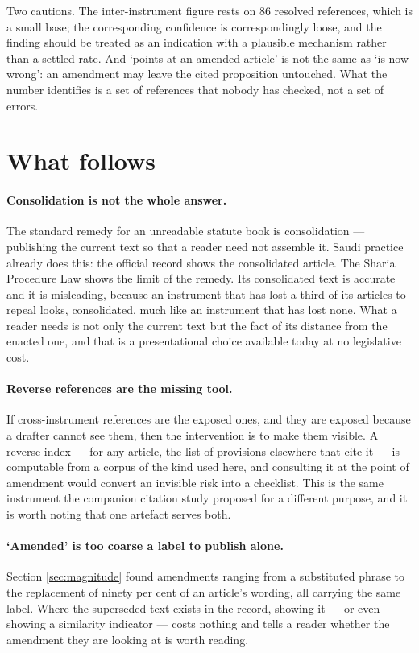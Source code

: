 \documentclass[11pt]{article}
\begin{document}
Two cautions. The inter-instrument figure rests on 86 resolved references,
which is a small base; the corresponding confidence is correspondingly loose,
and the finding should be treated as an indication with a plausible mechanism
rather than a settled rate. And `points at an amended article' is not the same
as `is now wrong': an amendment may leave the cited proposition untouched.
What the number identifies is a set of references that nobody has checked, not
a set of errors.

\section{What follows}

\paragraph{Consolidation is not the whole answer.} The standard remedy for an
unreadable statute book is consolidation --- publishing the current text so
that a reader need not assemble it. Saudi practice already does this: the
official record shows the consolidated article. The Sharia Procedure Law shows
the limit of the remedy. Its consolidated text is accurate and it is
misleading, because an instrument that has lost a third of its articles to
repeal looks, consolidated, much like an instrument that has lost none. What a
reader needs is not only the current text but the fact of its distance from
the enacted one, and that is a presentational choice available today at no
legislative cost.

\paragraph{Reverse references are the missing tool.} If cross-instrument
references are the exposed ones, and they are exposed because a drafter cannot
see them, then the intervention is to make them visible. A reverse index ---
for any article, the list of provisions elsewhere that cite it --- is
computable from a corpus of the kind used here, and consulting it at the point
of amendment would convert an invisible risk into a checklist. This is the
same instrument the companion citation study proposed for a different purpose,
and it is worth noting that one artefact serves both.

\paragraph{`Amended' is too coarse a label to publish alone.} Section
\ref{sec:magnitude} found amendments ranging from a substituted phrase to the
replacement of ninety per cent of an article's wording, all carrying the same
label. Where the superseded text exists in the record, showing it --- or even
showing a similarity indicator --- costs nothing and tells a reader whether
the amendment they are looking at is worth reading.
\end{document}

